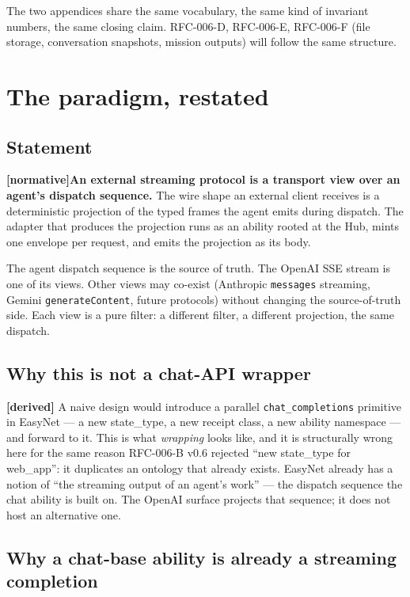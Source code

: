 \documentclass[11pt,a4paper]{article}
\newcommand{\normsv}{\textcolor{normativecolor}{\textbf{[normative]}}\xspace}
\newcommand{\derived}{\textcolor{derivedcolor}{\textbf{[derived]}}\xspace}
\theoremstyle{definition}
\begin{document}
The two appendices share the same vocabulary, the same kind of
invariant numbers, the same closing claim. RFC-006-D, RFC-006-E,
RFC-006-F (file storage, conversation snapshots, mission outputs)
will follow the same structure.

\section{The paradigm, restated}
\label{sec:paradigm}

\subsection{Statement}

\normsv{}\textbf{An external streaming protocol is a transport
view over an agent's dispatch sequence.} The wire shape an
external client receives is a deterministic projection of the
typed frames the agent emits during dispatch. The adapter that
produces the projection runs as an ability rooted at the Hub,
mints one envelope per request, and emits the projection as
its body.

The agent dispatch sequence is the source of truth. The OpenAI
SSE stream is one of its views. Other views may co-exist (Anthropic
\texttt{messages} streaming, Gemini \texttt{generateContent},
future protocols) without changing the source-of-truth side.
Each view is a pure filter: a different filter, a different
projection, the same dispatch.

\subsection{Why this is not a chat-API wrapper}

\derived{} A naive design would introduce a parallel
\texttt{chat\_completions} primitive in EasyNet --- a new
state\_type, a new receipt class, a new ability namespace ---
and forward to it. This is what \emph{wrapping} looks like, and
it is structurally wrong here for the same reason RFC-006-B v0.6
rejected ``new state\_type for web\_app'': it duplicates an
ontology that already exists. EasyNet already has a notion of
``the streaming output of an agent's work'' --- the dispatch
sequence the chat ability is built on. The OpenAI surface
projects that sequence; it does not host an alternative one.

\subsection{Why a chat-base ability is already a streaming
completion}
\end{document}
